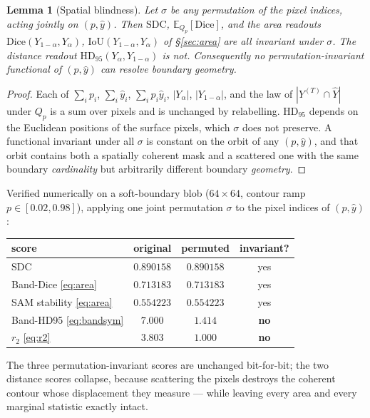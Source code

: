 \documentclass[11pt]{article}
\newtheorem{lemma}{Lemma}
\theoremstyle{remark}
\newcommand{\Yhat}{\widehat{Y}}
\newcommand{\Ylo}{Y_{\alpha}}
\newcommand{\Yhi}{Y_{1-\alpha}}
\newcommand{\HDF}{\mathrm{HD}_{95}}
\newcommand{\Dice}{\mathrm{Dice}}
\newcommand{\IoU}{\mathrm{IoU}}
\newcommand{\SDC}{\mathrm{SDC}}
\newcommand{\Ex}{\mathbb{E}}
\begin{document}
\begin{lemma}[Spatial blindness]\label{lem:perm}
Let $\sigma$ be any permutation of the pixel indices, acting jointly on $(p,\hat y)$.
Then $\SDC$, $\Ex_{Q_p}[\Dice]$, and the area readouts
$\Dice(\Yhi,\Ylo)$, $\IoU(\Yhi,\Ylo)$ of \S\ref{sec:area} are all invariant under
$\sigma$. The distance readout $\HDF(\Ylo,\Yhi)$ is not. Consequently no
permutation-invariant functional of $(p,\hat y)$ can resolve boundary geometry.
\end{lemma}
\begin{proof}
Each of $\sum_i p_i$, $\sum_i \hat y_i$, $\sum_i p_i\hat y_i$, $|\Ylo|$, $|\Yhi|$,
and the law of $|Y^{(T)}\cap\Yhat|$ under $Q_p$ is a sum over pixels and is
unchanged by relabelling. $\HDF$ depends on the Euclidean positions of the surface
pixels, which $\sigma$ does not preserve. A functional invariant under all
$\sigma$ is constant on the orbit of any $(p,\hat y)$, and that orbit contains both
a spatially coherent mask and a scattered one with the same boundary
\emph{cardinality} but arbitrarily different boundary \emph{geometry}.
\end{proof}

Verified numerically on a soft-boundary blob ($64\times64$, contour ramp
$p\!\in\![0.02,0.98]$), applying one joint permutation $\sigma$ to the pixel
indices of $(p,\hat y)$:

\begin{center}
\small
\begin{tabular}{lccc}
\toprule
score & original & permuted & invariant? \\
\midrule
$\SDC$                                   & $0.890158$ & $0.890158$ & yes \\
Band-Dice \eqref{eq:area}                & $0.713183$ & $0.713183$ & yes \\
SAM stability \eqref{eq:area}            & $0.554223$ & $0.554223$ & yes \\
Band-HD95 \eqref{eq:bandsym}             & $7.000$ & $1.414$ & \textbf{no} \\
$r_2$ \eqref{eq:r2}                      & $3.803$ & $1.000$ & \textbf{no} \\
\bottomrule
\end{tabular}
\end{center}

The three permutation-invariant scores are unchanged bit-for-bit; the two
distance scores collapse, because scattering the pixels destroys the coherent
contour whose displacement they measure --- while leaving every area and every
marginal statistic exactly intact.
\end{document}
